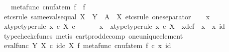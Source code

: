 \begin{isabellebody}
\ \ \ {\isachardoublequoteopen}metafunc\ {\isacharparenleft}{\kern0pt}cnufatem\ f{\isacharparenright}{\kern0pt}\ {\isacharequal}{\kern0pt}\ f{\isachardoublequoteclose}\isanewline
%
\isadelimproof
%
\endisadelimproof
%
\isatagproof
{}\isamarkupfalse%
\ {\isacharparenleft}{\kern0pt}etcs{\isacharunderscore}{\kern0pt}rule\ same{\isacharunderscore}{\kern0pt}evals{\isacharunderscore}{\kern0pt}equal{\isacharbrackleft}{\kern0pt}\ X\ {\isacharequal}{\kern0pt}\ Y{\isacharcomma}{\kern0pt}\ \ A\ {\isacharequal}{\kern0pt}\ X{\isacharbrackright}{\kern0pt}{\isacharcomma}{\kern0pt}\ etcs{\isacharunderscore}{\kern0pt}rule\ one{\isacharunderscore}{\kern0pt}separator{\isacharparenright}{\kern0pt}\isanewline
\ \ \isamarkupfalse%
\ x{}\isanewline
\ \ \isamarkupfalse%
\ x{}{\isacharunderscore}{\kern0pt}type{\isacharbrackleft}{\kern0pt}type{\isacharunderscore}{\kern0pt}rule{\isacharbrackright}{\kern0pt}{\isacharcolon}{\kern0pt}\ {\isachardoublequoteopen}x{}\ {\isasymin}\isactrlsub c\ X\ {\isasymtimes}\isactrlsub c\ {\isasymone}{\isachardoublequoteclose}\isanewline
\ \ \isamarkupfalse%
\ \isamarkupfalse%
\ x\ \ x{\isacharunderscore}{\kern0pt}type{\isacharbrackleft}{\kern0pt}type{\isacharunderscore}{\kern0pt}rule{\isacharbrackright}{\kern0pt}{\isacharcolon}{\kern0pt}\ {\isachardoublequoteopen}x\ {\isasymin}\isactrlsub c\ X{\isachardoublequoteclose}\ \ x{\isacharunderscore}{\kern0pt}def{\isacharcolon}{\kern0pt}\ {\isachardoublequoteopen}\ x{}\ {\isacharequal}{\kern0pt}\ {\isasymlangle}x{\isacharcomma}{\kern0pt}\ id\ {\isasymone}{\isasymrangle}{\isachardoublequoteclose}\isanewline
\ \ \ \ \isamarkupfalse%
\ {\isacharparenleft}{\kern0pt}typecheck{\isacharunderscore}{\kern0pt}cfuncs{\isacharcomma}{\kern0pt}\ metis\ cart{\isacharunderscore}{\kern0pt}prod{\isacharunderscore}{\kern0pt}decomp\ one{\isacharunderscore}{\kern0pt}unique{\isacharunderscore}{\kern0pt}element{\isacharparenright}{\kern0pt}\isanewline
\ \ \isamarkupfalse%
\ {\isachardoublequoteopen}{\isacharparenleft}{\kern0pt}eval{\isacharunderscore}{\kern0pt}func\ Y\ X\ {\isasymcirc}\isactrlsub c\ id\isactrlsub c\ X\ {\isasymtimes}\isactrlsub f\ metafunc\ {\isacharparenleft}{\kern0pt}cnufatem\ f{\isacharparenright}{\kern0pt}{\isacharparenright}{\kern0pt}\ {\isasymcirc}\isactrlsub c\ {\isasymlangle}x{\isacharcomma}{\kern0pt}\ id\ {\isasymone}{\isasymrangle}\ {\isacharequal}{\kern0pt}\isanewline

\end{isabellebody}
